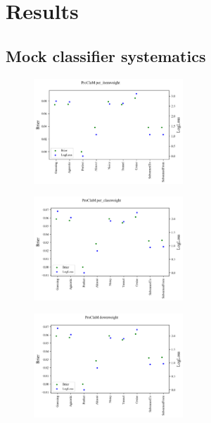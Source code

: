 \section{Results}
\label{sec:results}



\subsection{Mock classifier systematics}
\label{sec:mockresults}

\begin{figure}
	\begin{center}
		\includegraphics[width=0.5\textwidth]{./fig/multi_metric_per_item.png}
		\caption{}
		\label{fig:plasticc_per_item}
	\end{center}
\end{figure}

\begin{figure}
	\begin{center}
		\includegraphics[width=0.5\textwidth]{./fig/multi_metric_per_class.png}
		\caption{}
		\label{fig:plasticc_per_class}
	\end{center}
\end{figure}

\begin{figure}
	\begin{center}
		\includegraphics[width=0.5\textwidth]{./fig/multi_metric_down.png}
		\caption{}
		\label{fig:plasticc_down}
	\end{center}
\end{figure}

